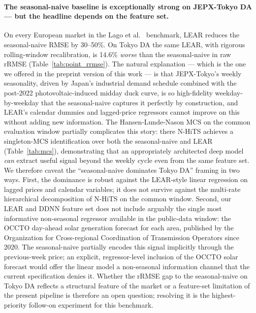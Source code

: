 \documentclass[review,3p,times,authoryear]{elsarticle}
\begin{document}
\paragraph{The seasonal-naive baseline is exceptionally strong on JEPX-Tokyo DA --- but the headline depends on the feature set.}
On every European market in the Lago et al.\ \citep{lago2021} benchmark, LEAR reduces the seasonal-naive RMSE by 30--50\%. On Tokyo DA the same LEAR, with rigorous rolling-window recalibration, is 14.6\% \emph{worse} than the seasonal-naive in raw rRMSE (Table~\ref{tab:point_rrmse}). The natural explanation --- which is the one we offered in the preprint version of this work --- is that JEPX-Tokyo's weekly seasonality, driven by Japan's industrial demand schedule combined with the post-2022 photovoltaic-induced midday duck curve, is so high-fidelity weekday-by-weekday that the seasonal-naive captures it perfectly by construction, and LEAR's calendar dummies and lagged-price regressors cannot improve on this without adding new information. The Hansen-Lunde-Nason MCS on the common evaluation window partially complicates this story: there N-HiTS achieves a singleton-MCS identification over both the seasonal-naive and LEAR (Table~\ref{tab:mcs}), demonstrating that an appropriately architected deep model \emph{can} extract useful signal beyond the weekly cycle even from the same feature set. We therefore caveat the ``seasonal-naive dominates Tokyo DA'' framing in two ways. First, the dominance is robust against the LEAR-style linear regression on lagged prices and calendar variables; it does not survive against the multi-rate hierarchical decomposition of N-HiTS on the common window. Second, our LEAR and DDNN feature set does not include arguably the single most informative non-seasonal regressor available in the public-data window: the OCCTO day-ahead solar generation forecast for each area, published by the Organization for Cross-regional Coordination of Transmission Operators since 2020. The seasonal-naive partially encodes this signal implicitly through the previous-week price; an explicit, regressor-level inclusion of the OCCTO solar forecast would offer the linear model a non-seasonal information channel that the current specification denies it. Whether the rRMSE gap to the seasonal-naive on Tokyo DA reflects a structural feature of the market or a feature-set limitation of the present pipeline is therefore an open question; resolving it is the highest-priority follow-on experiment for this benchmark.
\end{document}
